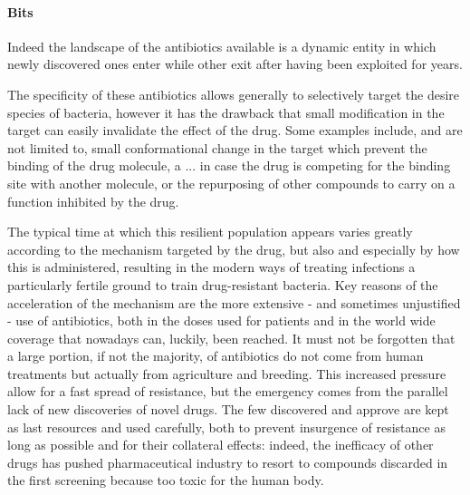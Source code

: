\documentclass[a4paper,11pt]{extreport}
\begin{document}
\clearpage





\paragraph{Bits}
Indeed the landscape of the antibiotics available is a dynamic entity in which newly discovered ones enter while other exit after having been exploited for years.

The specificity of these antibiotics allows generally to selectively target the desire species of bacteria, however it has the drawback that small modification in the target can easily invalidate the effect of the drug. Some examples include, and are not limited to, small conformational change in the target which prevent the binding of the drug molecule, a ... in case the drug is competing for the binding site with another molecule, or the repurposing of other compounds to carry on a function inhibited by the drug.

The typical time at which this resilient population appears varies greatly according to the mechanism targeted by the drug, but also and especially by how this is administered, resulting in the modern ways of treating infections a particularly fertile ground to train drug-resistant bacteria. Key reasons of the acceleration of the mechanism are the more extensive - and sometimes unjustified - use of antibiotics, both in the doses used for patients and in the world wide coverage that nowadays can, luckily, been reached. It must not be forgotten that a large portion, if not the majority, of antibiotics do not come from human treatments but actually from agriculture and breeding.
%
This increased pressure allow for a fast spread of resistance, but the emergency comes from the parallel lack of new discoveries of novel drugs. The few discovered and approve are kept as last resources and used carefully, both to prevent insurgence of resistance as long as possible and for their collateral effects: indeed, the inefficacy of other drugs has pushed pharmaceutical industry to resort to compounds discarded in the first screening because too toxic for the human body.
\end{document}
